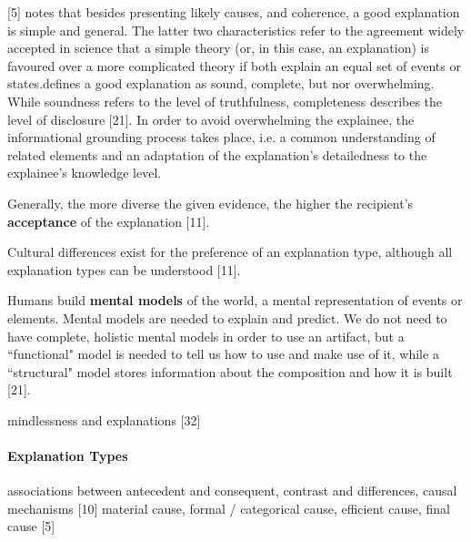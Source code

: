 [5] notes that besides presenting likely causes, and coherence, a good explanation is simple and general. The latter two characteristics refer to the agreement widely accepted in science that a simple theory (or, in this case, an explanation) is favoured over a more complicated theory if both explain an equal set of events or states.\newline
[21] defines a good explanation as sound, complete, but nor overwhelming. While soundness refers to the level of truthfulness, completeness describes the level of disclosure [21]. In order to avoid overwhelming the explainee, the informational grounding process takes place, i.e. a common understanding of related elements and an adaptation of the explanation's detailedness to the explainee's knowledge level.\newline

Generally, the more diverse the given evidence, the higher the recipient's \textbf{acceptance} of the explanation [11].\newline

Cultural differences exist for the preference of an explanation type, although all explanation types can be understood [11].\newline

Humans build \textbf{mental models} of the world, a mental representation of events or elements. Mental models are needed to explain and predict. We do not need to have complete, holistic mental models in order to use an artifact, but a ``functional" model is needed to tell us how to use and make use of it, while a ``structural" model stores information about the composition and how it is built [21]. \newline

mindlessness and explanations [32]\newline

\paragraph{Explanation Types}
associations between antecedent and consequent, contrast and differences, causal mechanisms [10] \newline
material cause, formal / categorical cause, efficient cause, final cause [5] \newline


